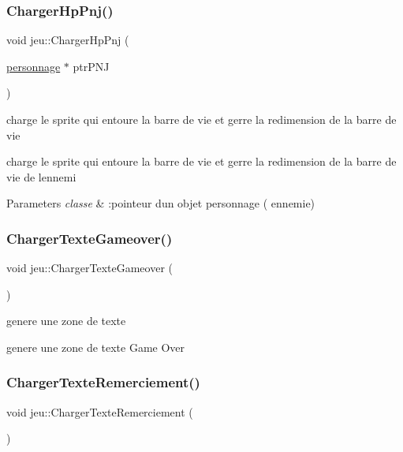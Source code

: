 \subsubsection{\texorpdfstring{Charger\+Hp\+Pnj()}{ChargerHpPnj()}}
{\footnotesize\ttfamily void jeu\+::\+Charger\+Hp\+Pnj (\begin{DoxyParamCaption}\item[{\mbox{\hyperlink{classpersonnage}{personnage}} $\ast$}]{ptr\+P\+NJ }\end{DoxyParamCaption})}



charge le sprite qui entoure la barre de vie et gerre la redimension de la barre de vie 

charge le sprite qui entoure la barre de vie et gerre la redimension de la barre de vie de l\textquotesingle{}ennemi


\begin{DoxyParams}{Parameters}
{\em classe} & \+:pointeur d\textquotesingle{}un objet personnage ( ennemie) \\
\hline
\end{DoxyParams}
\mbox{\label{classjeu_a79b4c4305a9aa1dde4183547ffb94203}} 
\subsubsection{\texorpdfstring{Charger\+Texte\+Gameover()}{ChargerTexteGameover()}}
{\footnotesize\ttfamily void jeu\+::\+Charger\+Texte\+Gameover (\begin{DoxyParamCaption}{ }\end{DoxyParamCaption})}



genere une zone de texte 

genere une zone de texte Game Over \mbox{\label{classjeu_a3c2e2246dd5ee2d41ccf37c7e78262d0}} 
\subsubsection{\texorpdfstring{Charger\+Texte\+Remerciement()}{ChargerTexteRemerciement()}}
{\footnotesize\ttfamily void jeu\+::\+Charger\+Texte\+Remerciement (\begin{DoxyParamCaption}{ }\end{DoxyParamCaption})}



